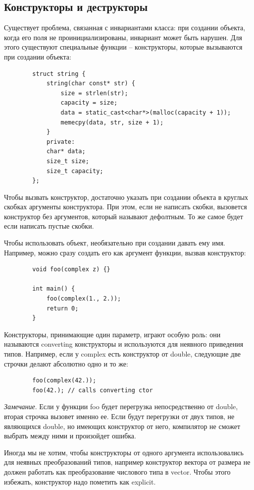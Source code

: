 \documentclass[12pt, a4paper]{article}
\begin{document}
	\subsection{Конструкторы и деструкторы}
	\par
	Существует проблема, связанная с инвариантами класса: при создании объекта, когда его поля не проинициализированы, инвариант может быть нарушен. Для этого существуют специальные функции -- конструкторы, которые вызываются при создании объекта:
	\begin{verbatim}
		struct string {
			string(char const* str) {
				size = strlen(str);
				capacity = size;
				data = static_cast<char*>(malloc(capacity + 1));
				memecpy(data, str, size + 1);
			}
			private:
			char* data;
			size_t size;
			size_t capacity;
		};
	\end{verbatim}
	\par Чтобы вызвать конструктор, достаточно указать при создании объекта в круглых скобках аргументы конструктора. При этом, если не написать скобки, вызовется конструктор без аргументов, который называют дефолтным. То же самое будет если написать пустые скобки.
	\par Чтобы использовать объект, необязательно при создании давать ему имя. Например, можно сразу создать его как аргумент функции, вызвав конструктор:
	\begin{verbatim}
		void foo(complex z) {}
		
		int main() {
			foo(complex(1., 2.));
			return 0;
		}
	\end{verbatim}
	\par Конструкторы, принимающие один параметр, играют особую роль: они называются converting конструкторы и используются для неявного приведения типов. Например, если у complex есть конструктор от double, следующие две строчки делают абсолютно одно и то же:
	\begin{verbatim}
		foo(complex(42.));
		foo(42.); // calls converting ctor
	\end{verbatim}
	\textit{Замечание}. Если у функции foo будет перегрузка непосредственно от double, вторая строчка вызовет именно ее. Если будут перегрузки от двух типов, не являющихся double, но имеющих конструктор от него, компилятор не сможет выбрать между ними и произойдет ошибка.
	\\\par Иногда мы не хотим, чтобы конструкторы от одного аргумента использовались для неявных преобразований типов, например конструктор вектора от размера не должен работать как преобразование числового типа в vector. Чтобы этого избежать, конструктор надо пометить как explicit.
\end{document}
